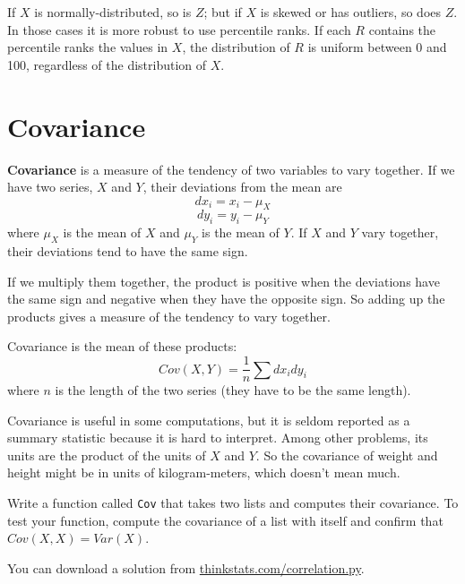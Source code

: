\documentclass[12pt]{book}
\begin{document}


If $X$ is normally-distributed, so is $Z$; but if $X$ is skewed or has
outliers, so does $Z$.  In those cases it is more robust to use
percentile ranks.  If each $R$ contains the percentile ranks the
values in $X$, the distribution of $R$ is uniform between 0 and 100,
regardless of the distribution of $X$.


\section{Covariance}


{\bf Covariance} is a measure of the tendency of two variables
to vary together.  If we have two series, $X$ and $Y$, their
deviations from the mean are
%
\[ dx_i = x_i - \mu_X \]
%
\[ dy_i = y_i - \mu_Y \]
%
where $\mu_X$ is the mean of $X$ and $\mu_Y$ is the mean of $Y$.
If $X$ and $Y$ vary together, their deviations tend to have the same
sign.

If we multiply them together, the product is positive when the
deviations have the same sign and negative when they have the opposite
sign.  So adding up the products gives a measure of the tendency to
vary together.

Covariance is the mean of these products:
%
\[ Cov(X,Y) = \frac{1}{n} \sum dx_i dy_i \]
%
where $n$ is the length of the two series (they have to be the same
length).

Covariance is useful in some computations, but
it is seldom reported as a summary statistic because it is hard to
interpret.  Among other problems, its units are the product of the
units of $X$ and $Y$.  So the covariance of weight and height might be
in units of kilogram-meters, which doesn't mean much.

\begin{ex}

Write a function called {\tt Cov} that takes two lists
and computes their covariance.  To test your function, compute
the covariance of a list with itself and confirm that
$Cov(X, X) = Var(X)$.

You can download a solution from
\url{thinkstats.com/correlation.py}.


\end{ex}
\end{document}

